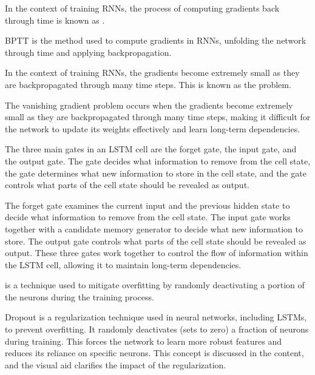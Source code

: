 \documentclass[11pt,addpoints,answers]{exam}
\begin{document}
\begin{questions}

\question[1] In the context of training RNNs, the process of computing gradients back through time is known as .
\begin{solution}
BPTT is the method used to compute gradients in RNNs, unfolding the network through time and applying backpropagation.
\end{solution}

\question[1] In the context of training RNNs, the gradients become extremely small as they are backpropagated through many time steps. This is known as the  problem.
\begin{solution}
The vanishing gradient problem occurs when the gradients become extremely small as they are backpropagated through many time steps, making it difficult for the network to update its weights effectively and learn long-term dependencies.
\end{solution}

\question[3] The three main gates in an LSTM cell are the forget gate, the input gate, and the output gate. The \fillin[forget] gate decides what information to remove from the cell state, the \fillin[input] gate determines what new information to store in the cell state, and the \fillin[output] gate controls what parts of the cell state should be revealed as output.
\begin{solution}
The forget gate examines the current input and the previous hidden state to decide what information to remove from the cell state. The input gate works together with a candidate memory generator to decide what new information to store. The output gate controls what parts of the cell state should be revealed as output. These three gates work together to control the flow of information within the LSTM cell, allowing it to maintain long-term dependencies.
\end{solution}

\question[1] \fillin[Dropout] is a technique used to mitigate overfitting by randomly deactivating a portion of the neurons during the training process.
\begin{solution}
Dropout is a regularization technique used in neural networks, including LSTMs, to prevent overfitting. It randomly deactivates (sets to zero) a fraction of neurons during training. This forces the network to learn more robust features and reduces its reliance on specific neurons. This concept is discussed in the content, and the visual aid clarifies the impact of the regularization.
\end{solution}


\end{questions}
\end{document}
